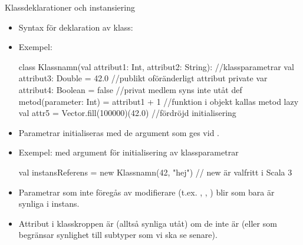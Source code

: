 \begin{Slide}{Klassdeklarationer och instansiering}\SlideFontSmall
\setlength{\leftmargini}{0pt}
\begin{itemize}
\item Syntax för deklaration av klass: \\ \vspace{0.5em}
\item Exempel: 
\begin{Code}
class Klassnamn(val attribut1: Int, attribut2: String):  //klassparametrar
  val attribut3: Double = 42.0              //publikt oföränderligt attribut
  private var attribut4: Boolean = false    //privat medlem syns inte utåt
  def metod(parameter: Int) = attribut1 + 1 //funktion i objekt kallas metod
  lazy val attr5 = Vector.fill(100000)(42.0)     //fördröjd initialisering
\end{Code}

\item Parametrar initialiseras med de argument som ges vid .
\item Exempel:  med argument för initialisering av klassparametrar
\begin{Code}
val instansReferens = new Klassnamn(42, "hej")  // new är valfritt i Scala 3 
\end{Code}

\item Parametrar som inte föregås av modifierare (t.ex. , , ) blir  som bara är synliga i  instans.
\item Attribut i klasskroppen är  (alltså synliga utåt) om de inte är  (eller  som begränsar synlighet till subtyper som vi ska se senare).
\end{itemize}
\end{Slide}




